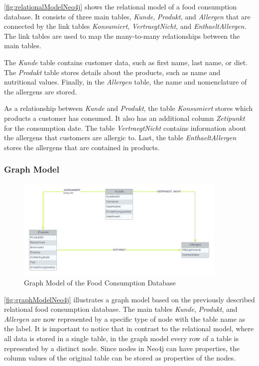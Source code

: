 \autoref{fig:relationalModelNeo4j} shows the relational model of a food consumption database. It consists of three main tables, \textit{Kunde}, \textit{Produkt}, and \textit{Allergen} that are connected by the link tables \textit{Konsumiert}, \textit{VertraegtNicht}, and \textit{EnthaeltAllergen}. The link tables are used to map the many-to-many relationships between the main tables.

The \textit{Kunde} table contains customer data, such as first name, last name, or diet. The \textit{Produkt} table stores details about the products, such as name and nutritional values. Finally, in the \textit{Allergen} table, the name and nomenclature of the allergens are stored.

As a relationship between \textit{Kunde} and \textit{Produkt}, the table \textit{Konsumiert} stores which products a customer has consumed. It also has an additional column \textit{Zetipunkt} for the consumption date. The table \textit{VertraegtNicht} contains information about the allergens that customers are allergic to. Last, the table \textit{EnthaeltAllergen} stores the allergens that are contained in products.

\subsubsection*{Graph Model}

\begin{figure}[H]
    \centering
    \caption{Graph Model of the Food Consumption Database}\label{fig:graphModelNeo4j}
    \includegraphics[width=0.9\textwidth]{images/neo4j_example_graph_model.png}
\end{figure}

\autoref{fig:graphModelNeo4j} illustrates a graph model based on the previously described relational food consumption database. The main tables \textit{Kunde}, \textit{Produkt}, and \textit{Allergen} are now represented by a specific type of node with the table name as the label. It is important to notice that in contrast to the relational model, where all data is stored in a single table, in the graph model every row of a table is represented by a distinct node. Since nodes in Neo4j can have properties, the column values of the original table can be stored as properties of the nodes.

